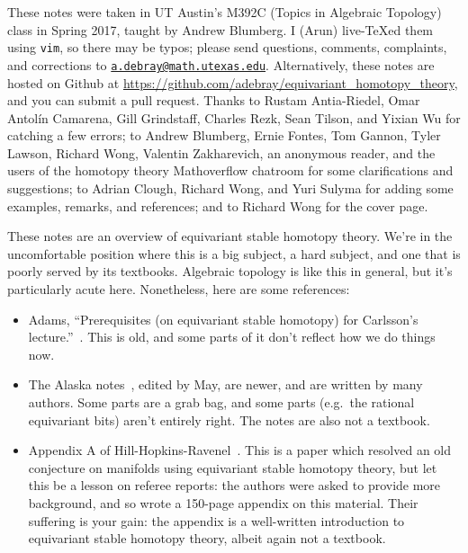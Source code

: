 
\versioninfo

These notes were taken in UT Austin’s M392C (Topics in Algebraic Topology) class in Spring 2017, taught by Andrew
Blumberg. I (Arun) live-\TeX ed them using \texttt{vim}, so there may be typos; please send questions, comments,
complaints, and corrections to
\href{mailto:a.debray@math.utexas.edu?subject=M392C\%20Lecture\%20Notes}{\texttt{a.debray@math.utexas.edu}}.
Alternatively, these notes are hosted on Github at \url{https://github.com/adebray/equivariant_homotopy_theory},
and you can submit a pull request. Thanks to Rustam Antia-Riedel, Omar Antolín Camarena, Gill Grindstaff, Charles
Rezk, Sean Tilson, and Yixian Wu for catching a few errors; to Andrew Blumberg, Ernie Fontes, Tom Gannon, Tyler
Lawson, Richard Wong, Valentin Zakharevich, an anonymous reader, and the users of the homotopy theory Mathoverflow
chatroom for some clarifications and suggestions; to Adrian Clough, Richard Wong, and Yuri Sulyma for adding some
examples, remarks, and references; and to Richard Wong for the cover page.


\orbreak

These notes are an overview of equivariant stable homotopy theory. We're in the uncomfortable position where this
is a big subject, a hard subject, and one that is poorly served by its textbooks. Algebraic topology is like this
in general, but it's particularly acute here. Nonetheless, here are some references:
\begin{itemize}
	\item Adams, ``Prerequisites (on equivariant stable homotopy) for Carlsson's lecture.''~\cite{Adams84}. This is
	old, and some parts of it don't reflect how we do things now.
	\item The Alaska notes~\cite{AlaskaNotes}, edited by May, are newer, and are written by many authors. Some
	parts are a grab bag, and some parts (e.g.\ the rational equivariant bits) aren't entirely right. The notes are
	also not a textbook.
	\item Appendix A of Hill-Hopkins-Ravenel~\cite{HHR}. This is a paper which resolved an old conjecture on
	manifolds using equivariant stable homotopy theory, but let this be a lesson on referee reports: the authors
	were asked to provide more background, and so wrote a 150-page appendix on this material. Their suffering is
	your gain: the appendix is a well-written introduction to equivariant stable homotopy theory, albeit again not
	a textbook.
\end{itemize}


